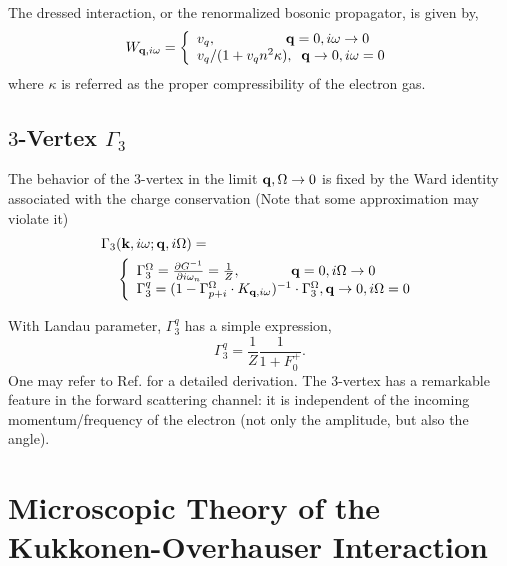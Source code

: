 \documentclass[reprint,amsmath,amssymb,aps,prb]{revtex4-1}
\begin{document}
The dressed interaction, or the renormalized bosonic propagator, is given by,
\begin{equation}
    \label{eq:interaction}
    W_{\mathbf{q}, i\omega}=\left\{
    \begin{array}{ll}
        v_q, \;\;\;\;\;\;\;\;\;\;\;\;\;\;\;\;\;\; \mathbf{q}=0, i\omega \rightarrow 0 \\
        v_q/(1+v_q n^2 \kappa), \;\; \mathbf{q}\rightarrow 0, i\omega=0
    \end{array}
    \right.
\end{equation}
where $\kappa$ is referred as the proper compressibility of the electron gas.

\subsection{$3$-Vertex $\Gamma_3$}

The behavior of the $3$-vertex in the limit $\mathbf{q}, \Omega \rightarrow 0$ is fixed by the Ward identity associated with the charge conservation (Note that some approximation may violate it)
\begin{align}
    \label{eq:gamma3}
    \Gamma_3 & (\mathbf{k}, i\omega; \mathbf{q}, i\Omega)= \nonumber \\
             & \left\{
    \begin{array}{ll}
        \Gamma_3^\Omega= \frac{\partial G^{-1}}{\partial i\omega_n}=\frac{1}{Z}, \;\;\;\;\;\;\;\;\;\;\;\;\; \mathbf{q} = 0, i\Omega \rightarrow 0 \\
        \Gamma_3^q =(1-\Gamma_{p+i}^\Omega \cdot K_{\mathbf{q}, i\omega})^{-1}\cdot\Gamma_3^\Omega,
        \mathbf{q} \rightarrow 0, i\Omega =0
    \end{array}
    \right.
\end{align}

With Landau parameter, $\Gamma_3^q$ has a simple expression,
\begin{equation}
    \Gamma_3^q=\frac{1}{Z}\frac{1}{1+F_0^+}.
\end{equation}
One may refer to Ref.  for a detailed derivation. The $3$-vertex has a remarkable feature in the forward scattering channel: it is independent of the incoming momentum/frequency of the electron (not only the amplitude, but also the angle).


\section{Microscopic Theory of the Kukkonen-Overhauser Interaction}
\end{document}
